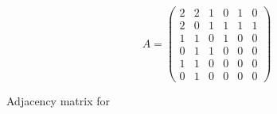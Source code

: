 \begin{table}[H]
  \begin{equation*}
    A = 
   \begin{pmatrix}
      2 & 2 & 1 & 0 & 1 & 0 \\
      2 & 0 & 1 & 1 & 1 & 1 \\
      1 & 1 & 0 & 1 & 0 & 0 \\
      0 & 1 & 1 & 0 & 0 & 0 \\
      1 & 1 & 0 & 0 & 0 & 0 \\
      0 & 1 & 0 & 0 & 0 & 0 
    \end{pmatrix}
  \end{equation*}
  \caption{Adjacency matrix for  }
\end{table}
